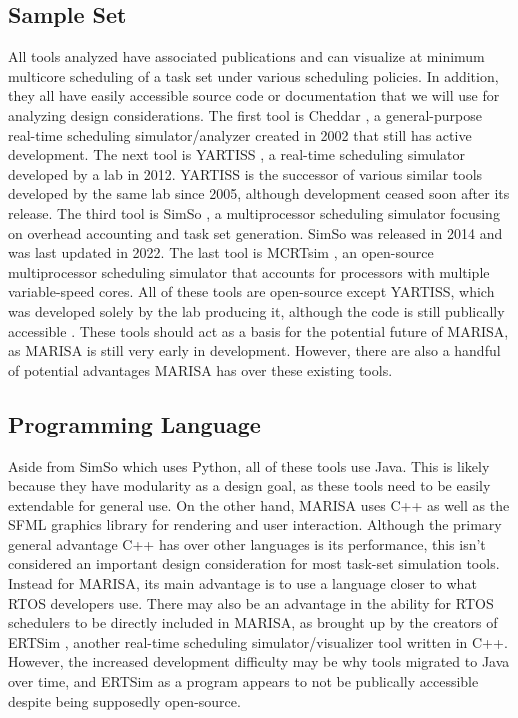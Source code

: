 \documentclass[conference,compsoc]{IEEEtran}
\begin{document}
\subsection{Sample Set}
All tools analyzed have associated publications and can visualize at minimum multicore scheduling of a task set under various scheduling policies. In addition, they all have easily accessible source code or documentation that we will use for analyzing design considerations.
The first tool is Cheddar \cite{cheddar_paper}, a general-purpose real-time scheduling simulator/analyzer created in 2002 that still has active development. The next tool is YARTISS \cite{yartiss_paper}, a real-time scheduling simulator developed by a lab in 2012. YARTISS is the successor of various similar tools developed by the same lab since 2005, although development ceased soon after its release. The third tool is SimSo \cite{simso_paper}, a multiprocessor scheduling simulator focusing on overhead accounting and task set generation. SimSo was released in 2014 and was last updated in 2022. The last tool is MCRTsim \cite{mcrtsim_paper}, an open-source multiprocessor scheduling simulator that accounts for processors with multiple variable-speed cores. All of these tools are open-source except YARTISS, which was developed solely by the lab producing it, although the code is still publically accessible \cite{yartiss_docs}. These tools should act as a basis for the potential future of MARISA, as MARISA is still very early in development. However, there are also a handful of potential advantages MARISA has over these existing tools.

\subsection{Programming Language}
Aside from SimSo which uses Python, all of these tools use Java. This is likely because they have modularity as a design goal, as these tools need to be easily extendable for general use. On the other hand, MARISA uses C++ as well as the SFML graphics library for rendering and user interaction. Although the primary general advantage C++ has over other languages is its performance, this isn't considered an important design consideration for most task-set simulation tools. Instead for MARISA, its main advantage is to use a language closer to what RTOS developers use. There may also be an advantage in the ability for RTOS schedulers to be directly included in MARISA, as brought up by the creators of ERTSim \cite{ertsim}, another real-time scheduling simulator/visualizer tool written in C++. However, the increased development difficulty may be why tools migrated to Java over time, and ERTSim as a program appears to not be publically accessible despite being supposedly open-source.
\end{document}
